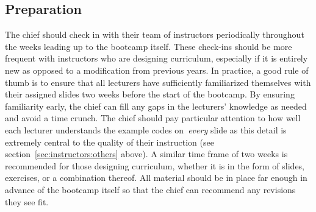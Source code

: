 \subsection{Preparation}
\label{sec:timeline:prep}
\noindent
The chief should check in with their team of instructors periodically
throughout the weeks leading up to the bootcamp itself.
These check-ins should be more frequent with instructors who are designing
curriculum, especially if it is entirely new as opposed to a modification from
previous years.
In practice, a good rule of thumb is to ensure that all lecturers have
sufficiently familiarized themselves with their assigned slides two weeks
before the start of the bootcamp.
By ensuring familiarity early, the chief can fill any gaps in the lecturers'
knowledge as needed and avoid a time crunch.
The chief should pay particular attention to how well each lecturer understands
the example codes on~\textit{every} slide as this detail is extremely central
to the quality of their instruction (see section~\ref{sec:instructors:others}
above).
A similar time frame of two weeks is recommended for those designing
curriculum, whether it is in the form of slides, exercises, or a combination
thereof.
All material should be in place far enough in advance of the bootcamp itself so
that the chief can recommend any revisions they see fit.

